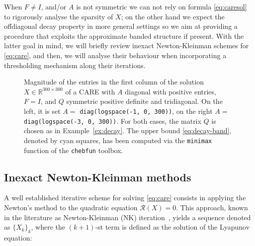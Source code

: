 \documentclass[a4paper,10pt]{article}
\newcommand{\upd}[1]{{\color{black}#1}} %
\begin{document}
When $F\neq I$, and/or $A$ is not symmetric we can not rely on formula \eqref{eq:caresol} to rigorously analyse the sparsity of $X$; on the other hand we expect the offdiagonal decay property in more general settings so we aim at providing a procedure that exploits the approximate banded structure if present. With the latter goal in mind, we will briefly review inexact Newton-Kleinman schemes for \eqref{eq:care}, and then\upd{,} we will analyse their behaviour when incorporating a thresholding mechanism along their iterations.
\begin{figure}
\centering
{}
\caption{Magnitude of the entries in the first column of the solution $X\in\mathbb R^{300\times 300}$ of a CARE with $A$ diagonal with positive entries, $F=I$, and $Q$ symmetric positive definite and tridiagonal. On the left, it is set $A=$ \texttt{diag(logspace(-1, 0, 300))}, on the right $A=$ \texttt{diag(logspace(-3, 0, 300))}. For both cases, the matrix $Q$ is chosen as in Example~\ref{ex:decay}. The upper bound \eqref{eq:decay-band}, denoted by cyan squares, has been computed via the \texttt{minimax} function of the \texttt{chebfun} toolbox.}\label{fig:decay-band}
\end{figure}

\subsection{Inexact Newton-Kleinman methods}\label{sec:tink}
A well established iterative scheme for solving  \eqref{eq:care} consists in applying the Newton's method to the quadratic equation $\mathcal R(X)=0$. This approach, known in the literature as Newton-Kleinman \upd{(NK)} iteration~\cite{kleinman1968iterative}, yields a sequence denoted as $\{X_k\}_k$, where the $(k+1)$-\upd{st} term is defined as the solution of the Lyapunov equation:
\end{document}
